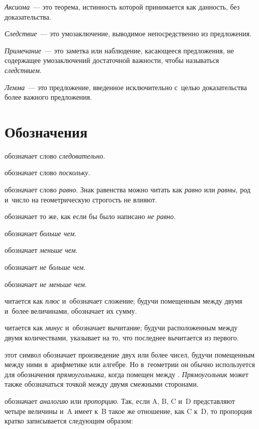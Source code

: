 \documentclass{byrne-book}
\begin{document}
\emph{Аксиома}~— это теорема, истинность которой принимается как данность, без доказательства.

\emph{Следствие}~— это умозаключение, выводимое непосредственно из предложения.

\emph{Примечание}~— это заметка или наблюдение, касающееся предложения, не содержащее умозаключений достаточной важности, чтобы называться \emph{следствием}.

\emph{Лемма}~— это предложение, введенное исключительно с~целью доказательства более важного предложения.



\vfill\pagebreak

\chapter*{Обозначения}

\symb{$\therefore$}
 обозначает слово \emph{следовательно}.

\symb{$\because$}
 обозначает слово \emph{поскольку}.

\symb{$=$}
 обозначает слово \emph{равно}. Знак равенства можно читать как \emph{равно} или \emph{равны}, род и~число на геометрическую строгость не влияют.

\symb{$\neq$}
 обозначает то же, как если бы было написано \emph{не равно}.

\symb{$>$}
 обозначает \emph{больше чем}.

\symb{$<$}
 обозначает \emph{меньше чем}.

\symb{$\ngtr$}
 обозначает \emph{не больше чем}.

\symb{$\nless$}
 обозначает \emph{не меньше чем}.

\symb{$+$}
 читается как \emph{плюс} и~обозначает сложение; будучи помещенным между двумя и~более величинами, обозначает их сумму.

\symb{$-$}
 читается как \emph{минус} и~обозначает вычитание; будучи расположенным между двумя количествами, указывает на то, что последнее вычитается из первого.

\symb{$\times$}
 этот символ обозначает произведение двух или более чисел, будучи помещенным между ними в~арифметике или алгебре. Но в~геометрии он обычно используется для обозначения \emph{прямоугольника}, когда помещен между . \emph{Прямоугольник} может также обозначаться точкой между двумя смежными сторонами.

\symb{$:\ ::\ :$}
 обозначает \emph{аналогию} или \emph{пропорцию}. Так, если A, B, C и~D представляют четыре величины и~A имеет к~B такое же отношение, как C к~D, то пропорция кратко записывается следующим образом:
\end{document}
